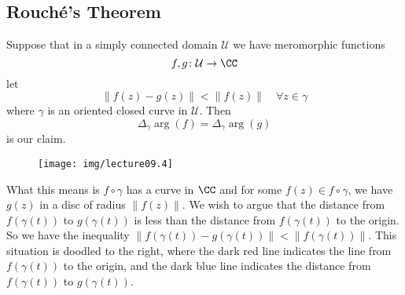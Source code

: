 \subsection{Rouch\'e's Theorem}

Suppose that in a simply connected domain $\mathcal{U}$ we have
meromorphic functions
\begin{equation}
f,g\colon\mathcal{U}\to\CC
\end{equation}
let
\begin{equation}
\|f(z)-g(z)\|<\|f(z)\|\quad\forall z\in\gamma
\end{equation}
where $\gamma$ is an oriented closed curve in $\mathcal{U}$. Then
\begin{equation}
\Delta_{\gamma}\arg(f)=\Delta_{\gamma}\arg(g)
\end{equation}
is our claim.

\begin{wrapfigure}[12]{r}{2.8in}
\vspace{-36pt}
\begin{center}
\texttt{[image: img/lecture09.4]}
\end{center}
\end{wrapfigure}
What this means is $f\circ\gamma$ has a curve in $\CC$ and for
some $f(z)\in f\circ\gamma$, we have $g(z)$ in a disc of radius
$\|f(z)\|$. We wish to argue that the distance from
$f(\gamma(t))$ to $g(\gamma(t))$ is less than the distance from
$f(\gamma(t))$ to the origin. So we have the inequality
$\|f(\gamma(t))-g(\gamma(t))\|<\|f(\gamma(t))\|$. This situation
is doodled to the right, where the dark red line indicates the
line from $f(\gamma(t))$ to the origin, and the dark blue line
indicates the distance from $f(\gamma(t))$ to $g(\gamma(t))$.

